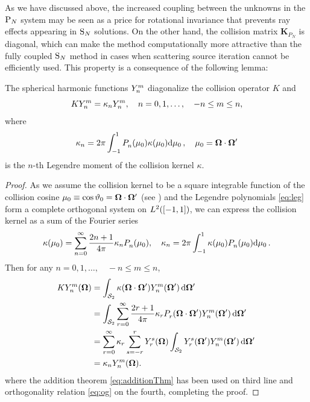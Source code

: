 As we have discussed above, the increased coupling between the
unknowns in the $\PN$ system may be seen as a price for rotational invariance
that prevents ray effects appearing in $\SN$ solutions. On the other hand, the collision matrix $\mathbf{K}_{P_N}$ is
diagonal, which can make the method computationally more attractive than the fully coupled $\SN$ method in cases when 
scattering source iteration cannot be efficiently used. This property is a consequence of the following lemma:

\begin{lemma}\label{lem:appC}
The spherical harmonic functions $\Y{n}{m}$ diagonalize the collision operator $K$ and
$$
	K\Y{n}{m} = \kappa_n \Y{n}{m},\quad n = 0,1,\ldots,\quad -n \leq m \leq n,
$$
where
$$
	\kappa_n = 2\pi \muint[_0]{\P{n}{}(\mu_0)\kappa(\mu_0)},\quad \mu_0 = \bomega\cdot\bomega'
$$
is the $n$-th Legendre moment of the collision kernel $\kappa$.
\end{lemma}  
\begin{proof}
	As we assume the collision kernel to be a square integrable function of the collision cosine  
	$\mu_0 \equiv \cos \polar_0 = \bomega\cdot\bomega'$ (see )
	and the Legendre polynomials \eqref{eq:leg} form a complete orthogonal system on $\Lp[2]([-1,1])$, we can express the
	collision kernel as a sum of the Fourier series
	$$
		\kappa(\mu_0) = \suma[n]{0}{\infty}\frac{2n+1}{4\pi}\kappa_n\P{n}{}(\mu_0),\quad
		\kappa_n = 2\pi \muint[_0]{\kappa(\mu_0)\P{n}{}(\mu_0)}.
	$$
	Then for any $n = 0,1,\ldots,\quad -n \leq m \leq n$,
	$$
\begin{aligned}
	K\Y{n}{m}(\bomega) &= \intA[']{\kappa(\bomega\cdot\bomega')\Y{n}{m}(\bomega')} \\
	&= \intA[']{\suma[r]{0}{\infty}\frac{2r+1}{4\pi}\kappa_r\P{r}{}(\bomega\cdot\bomega')\Y{n}{m}(\bomega')} \\
	&= \suma[r]{0}{\infty}\kappa_r\suma[s]{-r}{r}\Y{r}{s}(\bomega)\intA[']{\Y{r}{s}(\bomega')\Y{n}{m}(\bomega')} \\
	&= \kappa_n\Y{n}{m}(\bomega).
\end{aligned}
	$$
	where the addition theorem \eqref{eq:additionThm} has been used on third line and orthogonality relation \eqref{eq:og}
	on the fourth, completing the proof.
\end{proof}

